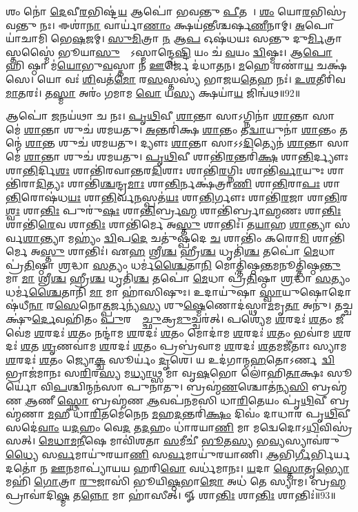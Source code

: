 𑌶𑌂 𑌨𑍋॑ \ul{𑌦𑍇}𑌵𑍀\ul{𑌰}𑌭𑌿𑌷𑍍𑌟॑\ul{𑌯} 𑌆𑌪𑍋॑ 𑌭𑌵𑌨𑍍𑌤𑍁 \ul{𑌪𑍀}𑌤𑌯𑍇᳚। 
\ul{𑌶𑌂} 𑌯𑍋\ul{𑌰}𑌭𑌿𑌸𑍍𑌰॑𑌵𑌨𑍍𑌤𑍁 𑌨𑌃। 
𑌈𑌶𑌾॑\ul{𑌨𑌾} 𑌵𑌾𑌰𑍍𑌯𑌾॑\ul{𑌣𑌾𑌂} 𑌕𑍍𑌷𑌯॑𑌨𑍍𑌤𑍀𑌶𑍍𑌚𑌰𑍍\mbox{}𑌷\ul{𑌣𑍀}𑌨𑌾𑌮𑍍। 
\ul{𑌅}𑌪𑍋 𑌯𑌾॑𑌚𑌾𑌮𑌿 𑌭𑍇\ul{𑌷}𑌜𑌮𑍍। 
\ul{𑌸𑍁}\ul{𑌮𑌿}𑌤𑍍𑌰𑌾 \ul{𑌨} 𑌆\ul{𑌪} 𑌓𑌷॑𑌧𑌯𑌃 𑌸𑌨𑍍𑌤𑍁 𑌦𑍁\ul{𑌰𑍍𑌮𑌿}𑌤𑍍𑌰𑌾𑌸𑍍𑌤𑌸𑍍𑌮𑍈॑ 𑌭𑍂𑌯𑌾\ul{𑌸𑍁}𑌰𑍍𑌯𑍋᳚𑌽𑌸𑍍𑌮𑌾𑌨𑍍𑌦𑍍𑌵𑍇\ul{𑌷𑍍𑌟𑌿} 𑌯𑌂 𑌚॑ \ul{𑌵}𑌯𑌂 \ul{𑌦𑍍𑌵𑌿}𑌷𑍍𑌮𑌃। 
𑌆\ul{𑌪𑍋} 𑌹𑌿 𑌷𑍍𑌠𑌾 𑌮॑\ul{𑌯𑍋}𑌭𑍁\ul{𑌵}𑌸𑍍𑌤𑌾 𑌨॑ \ul{𑌊}𑌰𑍍𑌜𑍇 𑌦॑𑌧𑌾𑌤𑌨। 
\ul{𑌮}𑌹𑍇 𑌰𑌣𑌾॑\ul{𑌯} 𑌚𑌕𑍍𑌷॑𑌸𑍇। 
𑌯𑍋 𑌵𑌃॑ \ul{𑌶𑌿}𑌵𑌤॑\ul{𑌮𑍋} 𑌰\ul{𑌸}𑌸𑍍𑌤𑌸𑍍𑌯॑ 𑌭𑌾𑌜𑌯\ul{𑌤𑍇}𑌹 𑌨𑌃॑। 
\ul{𑌉}\ul{𑌶}𑌤𑍀𑌰𑌿॑𑌵 \ul{𑌮𑌾}𑌤𑌰𑌃॑। 
𑌤\ul{𑌸𑍍𑌮𑌾} 𑌅𑌰𑌂॑ 𑌗𑌮𑌾𑌮 \ul{𑌵𑍋} 𑌯\ul{𑌸𑍍𑌯} 𑌕𑍍𑌷𑌯𑌾॑\ul{𑌯} 𑌜𑌿𑌨𑍍𑌵॑𑌥॥92॥

𑌆𑌪𑍋॑ \ul{𑌜}𑌨𑌯॑𑌥𑌾 𑌚 𑌨𑌃। 
\ul{𑌪𑍃}\ul{𑌥𑌿}𑌵𑍀 \ul{𑌶𑌾}𑌨𑍍𑌤𑌾 𑌸𑌾𑌽𑌗𑍍𑌨𑌿𑌨𑌾॑ \ul{𑌶𑌾}𑌨𑍍𑌤𑌾 𑌸𑌾 𑌮𑍇॑ \ul{𑌶𑌾}𑌨𑍍𑌤𑌾 𑌶𑍁𑌚॑ 𑌶𑌮𑌯𑌤𑍁। 
\ul{𑌅}𑌨𑍍𑌤𑌰𑌿॑𑌕𑍍𑌷 \ul{𑌶𑌾}𑌨𑍍𑌤𑌂 𑌤\ul{𑌦𑍍𑌵𑌾}𑌯𑍁𑌨𑌾॑ \ul{𑌶𑌾}𑌨𑍍𑌤𑌂 𑌤𑌨𑍍𑌮𑍇॑ \ul{𑌶𑌾}𑌨𑍍𑌤 𑌶𑍁𑌚॑ 𑌶𑌮𑌯𑌤𑍁। 
𑌦𑍍𑌯𑍗𑌃  \ul{𑌶𑌾}𑌨𑍍𑌤𑌾 𑌸𑌾𑌽𑌽\ul{𑌦𑌿}𑌤𑍍𑌯𑍇𑌨॑ \ul{𑌶𑌾}𑌨𑍍𑌤𑌾 𑌸𑌾 𑌮𑍇॑ \ul{𑌶𑌾}𑌨𑍍𑌤𑌾 𑌶𑍁𑌚॑ 𑌶𑌮𑌯𑌤𑍁। 
\ul{𑌪𑍃}\ul{𑌥𑌿}𑌵𑍀 𑌶𑌾𑌨𑍍𑌤𑌿॑\ul{𑌰}𑌨𑍍𑌤𑌰𑌿॑\ul{𑌕𑍍𑌷}\ul{} 𑌶𑌾\ul{𑌨𑍍𑌤𑌿}𑌰𑍍𑌦𑍍𑌯𑍗𑌃  𑌶𑌾\ul{𑌨𑍍𑌤𑌿}𑌰𑍍𑌦𑌿\ul{𑌶𑌃} 𑌶𑌾𑌨𑍍𑌤𑌿॑𑌰𑌵𑌾𑌨𑍍𑌤𑌰\ul{𑌦𑌿}𑌶𑌾𑌃  𑌶𑌾𑌨𑍍𑌤𑌿॑\ul{𑌰}𑌗𑍍𑌨𑌿𑌃  𑌶𑌾𑌨𑍍𑌤𑌿॑\ul{𑌰𑍍𑌵𑌾}𑌯𑍁𑌃  𑌶𑌾𑌨𑍍𑌤𑌿॑𑌰𑌾\ul{𑌦𑌿}𑌤𑍍𑌯𑌃  𑌶𑌾𑌨𑍍𑌤𑌿॑\ul{𑌶𑍍𑌚}𑌨𑍍𑌦𑍍𑌰\ul{𑌮𑌾𑌃} 𑌶𑌾\ul{𑌨𑍍𑌤𑌿}𑌰𑍍𑌨𑌕𑍍𑌷॑𑌤𑍍𑌰𑌾\ul{𑌣𑌿} 𑌶𑌾\ul{𑌨𑍍𑌤𑌿}𑌰𑌾\ul{𑌪𑌃} 𑌶𑌾\ul{𑌨𑍍𑌤𑌿}𑌰𑍋𑌷॑𑌧\ul{𑌯𑌃} 𑌶𑌾\ul{𑌨𑍍𑌤𑌿}𑌰𑍍𑌵\ul{𑌨}𑌸𑍍𑌪𑌤॑\ul{𑌯𑌃} 𑌶𑌾\ul{𑌨𑍍𑌤𑌿}𑌰𑍍𑌗𑍗𑌃  𑌶𑌾𑌨𑍍𑌤𑌿॑\ul{𑌰}𑌜𑌾 𑌶𑌾\ul{𑌨𑍍𑌤𑌿}𑌰\ul{𑌶𑍍𑌵𑌃} 𑌶𑌾\ul{𑌨𑍍𑌤𑌿𑌃} 𑌪𑍁𑌰𑍁॑\ul{𑌷𑌃} 𑌶𑌾\ul{𑌨𑍍𑌤𑌿}𑌰𑍍𑌬𑍍𑌰\ul{𑌹𑍍𑌮} 𑌶𑌾𑌨𑍍𑌤𑌿॑𑌰𑍍𑌬𑍍𑌰𑌾\ul{𑌹𑍍𑌮}𑌣𑌃  𑌶𑌾\ul{𑌨𑍍𑌤𑌿𑌃} 𑌶𑌾𑌨𑍍𑌤𑌿॑\ul{𑌰𑍇}𑌵 𑌶𑌾\ul{𑌨𑍍𑌤𑌿𑌃} 𑌶𑌾𑌨𑍍𑌤𑌿॑𑌰𑍍𑌮𑍇 𑌅\ul{𑌸𑍍𑌤𑍁} 𑌶𑌾𑌨𑍍𑌤𑌿𑌃॑। 
𑌤\ul{𑌯𑌾}𑌹 \ul{𑌶𑌾}𑌨𑍍𑌤𑍍𑌯𑌾 𑌸॑𑌰𑍍𑌵\ul{𑌶𑌾}𑌨𑍍𑌤𑍍𑌯𑌾 𑌮𑌹𑍍𑌯𑌂॑ \ul{𑌦𑍍𑌵𑌿}𑌪\ul{𑌦𑍇} 𑌚𑌤𑍁॑𑌷𑍍𑌪𑌦𑍇 \ul{𑌚} 𑌶𑌾𑌨𑍍𑌤𑌿𑌂॑ 𑌕𑌰𑍋\ul{𑌮𑌿} 𑌶𑌾𑌨𑍍𑌤𑌿॑𑌰𑍍𑌮𑍇 𑌅\ul{𑌸𑍍𑌤𑍁} 𑌶𑌾𑌨𑍍𑌤𑌿𑌃॑। 
𑌏\ul{𑌹} 𑌶𑍍𑌰𑍀\ul{𑌶𑍍𑌚} 𑌹𑍍𑌰𑍀\ul{𑌶𑍍𑌚} 𑌧𑍃𑌤𑌿॑\ul{𑌶𑍍𑌚} 𑌤𑌪𑍋॑ \ul{𑌮𑍇}𑌧𑌾 𑌪𑍍𑌰॑\ul{𑌤𑌿}𑌷𑍍𑌠𑌾 \ul{𑌶𑍍𑌰}𑌦𑍍𑌧𑌾 \ul{𑌸}𑌤𑍍𑌯𑌂 𑌧𑌰𑍍𑌮॑\ul{𑌶𑍍𑌚𑍈}𑌤𑌾\ul{𑌨𑌿} 𑌮𑍋𑌤𑍍𑌤𑌿॑𑌷𑍍𑌠\ul{𑌨𑍍𑌤}𑌮𑌨𑍂𑌤𑍍𑌤𑌿॑𑌷𑍍𑌠\ul{𑌨𑍍𑌤𑍁} 𑌮𑌾 \ul{𑌮𑌾}\ul{} 𑌶𑍍𑌰𑍀\ul{𑌶𑍍𑌚} 𑌹𑍍𑌰𑍀\ul{𑌶𑍍𑌚} 𑌧𑍃𑌤𑌿॑\ul{𑌶𑍍𑌚} 𑌤𑌪𑍋॑ \ul{𑌮𑍇}𑌧𑌾 𑌪𑍍𑌰॑\ul{𑌤𑌿}𑌷𑍍𑌠𑌾 \ul{𑌶𑍍𑌰}𑌦𑍍𑌧𑌾 \ul{𑌸}𑌤𑍍𑌯𑌂 𑌧𑌰𑍍𑌮॑\ul{𑌶𑍍𑌚𑍈}𑌤𑌾𑌨𑌿॑ \ul{𑌮𑌾} 𑌮𑌾 𑌹𑌾॑𑌸𑌿𑌷𑍁𑌃। 
𑌉𑌦𑌾𑌯𑍁॑𑌷𑌾 \ul{𑌸𑍍𑌵𑌾}𑌯𑍁𑌷𑍋𑌦𑍋𑌷॑𑌧𑍀\ul{𑌨𑌾}\ul{} 𑌰\ul{𑌸𑍇}𑌨𑍋\ul{𑌤𑍍𑌪}𑌰𑍍𑌜𑌨𑍍𑌯॑\ul{𑌸𑍍𑌯} 𑌶𑍁\ul{𑌷𑍍𑌮𑍇}𑌣𑍋𑌦॑𑌸𑍍𑌥𑌾\ul{𑌮}𑌮𑍃\ul{𑌤𑌾}\ul{} 𑌅𑌨𑍁॑। 
𑌤𑌚𑍍𑌚𑌕𑍍𑌷𑍁॑\ul{𑌰𑍍𑌦𑍇}𑌵𑌹𑌿॑𑌤𑌂 \ul{𑌪𑍁}𑌰𑌸𑍍𑌤𑌾᳚\ul{𑌚𑍍𑌛𑍁}𑌕𑍍𑌰\ul{𑌮𑍁}𑌚𑍍𑌚𑌰॑𑌤𑍍। 
𑌪𑌶𑍍𑌯𑍇॑𑌮 \ul{𑌶}𑌰𑌦𑌃॑ \ul{𑌶}𑌤𑌂 𑌜𑍀𑌵𑍇॑𑌮 \ul{𑌶}𑌰𑌦𑌃॑ \ul{𑌶}𑌤𑌂 𑌨𑌨𑍍𑌦𑌾॑𑌮 \ul{𑌶}𑌰𑌦𑌃॑ \ul{𑌶}𑌤𑌂 𑌮𑍋𑌦𑌾॑𑌮 \ul{𑌶}𑌰𑌦𑌃॑ \ul{𑌶}𑌤𑌂 𑌭𑌵𑌾॑𑌮 \ul{𑌶}𑌰𑌦𑌃॑ \ul{𑌶}𑌤 \ul{𑌶𑍃}𑌣𑌵𑌾॑𑌮 \ul{𑌶}𑌰𑌦𑌃॑ \ul{𑌶}𑌤𑌂 𑌪𑍍𑌰𑌬𑍍𑌰॑𑌵𑌾𑌮 \ul{𑌶}𑌰𑌦𑌃॑ \ul{𑌶}𑌤𑌮𑌜𑍀॑𑌤𑌾𑌃 𑌸𑍍𑌯𑌾𑌮 \ul{𑌶}𑌰𑌦𑌃॑ \ul{𑌶}𑌤𑌂 𑌜𑍍𑌯𑍋\ul{𑌕𑍍𑌚} 𑌸𑍂𑌰𑍍𑌯𑌂॑ \ul{𑌦𑍃}𑌶𑍇। 
𑌯 𑌉𑌦॑𑌗𑌾𑌨𑍍𑌮\ul{𑌹}𑌤𑍋𑌽𑌰𑍍𑌣𑌵𑌾᳚\ul{𑌦𑍍𑌵𑌿}𑌭𑍍𑌰𑌾𑌜॑𑌮𑌾𑌨𑌃 𑌸\ul{𑌰𑌿}𑌰\ul{𑌸𑍍𑌯} 𑌮\ul{𑌧𑍍𑌯𑌾}𑌥𑍍𑌸 𑌮𑌾॑ 𑌵𑍃\ul{𑌷}𑌭𑍋 𑌲𑍋॑𑌹𑌿\ul{𑌤𑌾}𑌕𑍍𑌷𑌃 𑌸𑍂𑌰𑍍𑌯𑍋॑ 𑌵𑌿\ul{𑌪}𑌶𑍍𑌚𑌿𑌨𑍍𑌮𑌨॑𑌸𑌾 𑌪𑍁𑌨𑌾𑌤𑍁। 
𑌬𑍍𑌰𑌹𑍍𑌮॑\ul{𑌣}𑌶𑍍𑌚𑍋𑌤॑𑌨𑍍𑌯\ul{𑌸𑌿} 𑌬𑍍𑌰𑌹𑍍𑌮॑𑌣 \ul{𑌆}𑌣𑍀 \ul{𑌸𑍍𑌥𑍋} 𑌬𑍍𑌰𑌹𑍍𑌮॑𑌣 \ul{𑌆}𑌵𑌪॑𑌨𑌮𑌸𑌿 𑌧𑌾\ul{𑌰𑌿}𑌤𑍇𑌯𑌂 𑌪𑍃॑\ul{𑌥𑌿}𑌵𑍀 𑌬𑍍𑌰𑌹𑍍𑌮॑𑌣𑌾 \ul{𑌮}𑌹𑍀 𑌧𑌾॑\ul{𑌰𑌿}𑌤𑌮𑍇॑𑌨𑍇𑌨 \ul{𑌮}𑌹\ul{𑌦}𑌨𑍍𑌤𑌰𑌿॑\ul{𑌕𑍍𑌷𑌂} 𑌦𑌿𑌵𑌂॑ 𑌦𑌾𑌧𑌾𑌰 𑌪𑍃\ul{𑌥𑌿}𑌵𑍀 𑌸𑌦𑍇॑\ul{𑌵𑌾𑌂} 𑌯\ul{𑌦}𑌹𑌂 𑌵𑍇\ul{𑌦} 𑌤\ul{𑌦}𑌹𑌂 𑌧𑌾॑𑌰𑌯𑌾\ul{𑌣𑌿} 𑌮𑌾 𑌮𑌦𑍍𑌵𑍇𑌦𑍋𑌽\ul{𑌧𑌿}𑌵𑌿𑌸𑍍𑌰॑𑌸𑌤𑍍। 
\ul{𑌮𑍇}\ul{𑌧𑌾}\ul{𑌮}\ul{𑌨𑍀}𑌷𑍇 𑌮𑌾𑌵𑌿॑𑌶𑌤𑌾 \ul{𑌸}𑌮𑍀𑌚𑍀॑ \ul{𑌭𑍂}𑌤\ul{𑌸𑍍𑌯} 𑌭\ul{𑌵𑍍𑌯}𑌸𑍍𑌯𑌾𑌵॑𑌰𑍁\ul{𑌧𑍍𑌯𑍈} 𑌸\ul{𑌰𑍍𑌵}𑌮𑌾𑌯𑍁॑𑌰𑌯𑌾\ul{𑌣𑌿} 𑌸\ul{𑌰𑍍𑌵}𑌮𑌾𑌯𑍁॑𑌰𑌯𑌾𑌣𑌿। 
\ul{𑌆}𑌭𑌿\ul{𑌰𑍍𑌗𑍀}𑌰𑍍𑌭𑌿𑌰𑍍𑌯𑌦𑌤𑍋॑ 𑌨 \ul{𑌊}𑌨𑌮𑌾𑌪𑍍𑌯𑌾॑𑌯𑌯 𑌹𑌰𑌿\ul{𑌵𑍋} 𑌵𑌰𑍍𑌧॑𑌮𑌾𑌨𑌃। 
\ul{𑌯}𑌦𑌾 \ul{𑌸𑍍𑌤𑍋}𑌤𑍃\ul{𑌭𑍍𑌯𑍋} 𑌮𑌹𑌿॑ \ul{𑌗𑍋}𑌤𑍍𑌰𑌾 \ul{𑌰𑍁}𑌜𑌾𑌸𑌿॑ 𑌭𑍂𑌯𑌿\ul{𑌷𑍍𑌠}𑌭𑌾\ul{𑌜𑍋} 𑌅𑌧॑ 𑌤𑍇 𑌸𑍍𑌯𑌾𑌮। 
𑌬𑍍𑌰\ul{𑌹𑍍𑌮} 𑌪𑍍𑌰𑌾𑌵𑌾॑𑌦𑌿\ul{𑌷𑍍𑌮} 𑌤\ul{𑌨𑍍𑌨𑍋} 𑌮𑌾 𑌹𑌾॑𑌸𑍀𑌤𑍍। 
𑍐 𑌶𑌾\ul{𑌨𑍍𑌤𑌿𑌃} 𑌶𑌾\ul{𑌨𑍍𑌤𑌿𑌃} 𑌶𑌾𑌨𑍍𑌤𑌿𑌃॑॥93॥\anuvakamend[\ul{𑌪}\ul{𑌰𑌾}𑌵𑌤𑍋॑ 𑌦𑌧𑌾𑌤𑍁 \ul{𑌬}𑌦𑍍𑌧𑌾𑌂 𑌜𑌿𑌨𑍍𑌵॑𑌥 \ul{𑌦𑍃}𑌶𑍇 \ul{𑌸}𑌪𑍍𑌤 𑌚॑]

